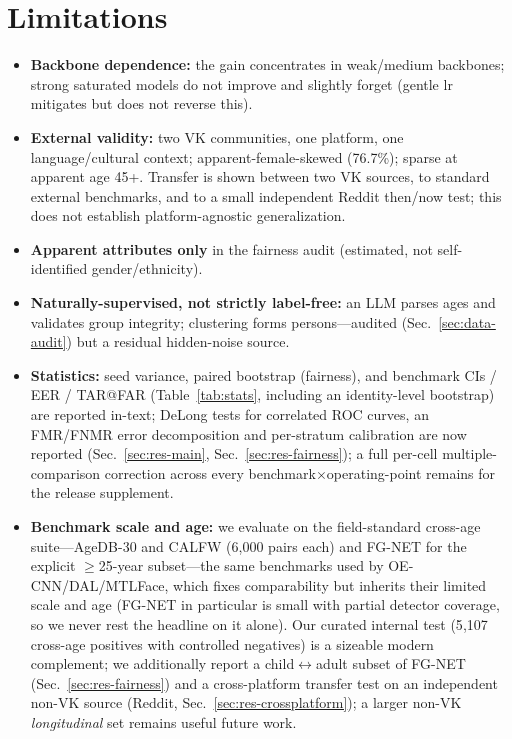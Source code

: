 \documentclass[journal]{IEEEtran}
\begin{document}
\section{Limitations}\label{sec:limitations}
\begin{itemize}[leftmargin=1.2em]
\item \textbf{Backbone dependence:} the gain concentrates in weak/medium backbones; strong saturated models do not improve and slightly forget (gentle lr mitigates but does not reverse this).
\item \textbf{External validity:} two VK communities, one platform, one language/cultural context; apparent-female-skewed (76.7\%); sparse at apparent age 45+. Transfer is shown between two VK sources, to standard external benchmarks, and to a small independent Reddit then/now test; this does not establish platform-agnostic generalization.
\item \textbf{Apparent attributes only} in the fairness audit (estimated, not self-identified gender/ethnicity).
\item \textbf{Naturally-supervised, not strictly label-free:} an LLM parses ages and validates group integrity; clustering forms persons---audited (Sec.~\ref{sec:data-audit}) but a residual hidden-noise source.
\item \textbf{Statistics:} seed variance, paired bootstrap (fairness), and benchmark CIs / EER / TAR@FAR (Table~\ref{tab:stats}, including an identity-level bootstrap) are reported in-text; DeLong tests for correlated ROC curves, an FMR/FNMR error decomposition and per-stratum calibration are now reported (Sec.~\ref{sec:res-main}, Sec.~\ref{sec:res-fairness}); a full per-cell multiple-comparison correction across every benchmark$\times$operating-point remains for the release supplement.
\item \textbf{Benchmark scale and age:} we evaluate on the field-standard cross-age suite---AgeDB-30 and CALFW (6{,}000 pairs each) and FG-NET for the explicit $\geq$25-year subset---the same benchmarks used by OE-CNN/DAL/MTLFace, which fixes comparability but inherits their limited scale and age (FG-NET in particular is small with partial detector coverage, so we never rest the headline on it alone). Our curated internal test (5{,}107 cross-age positives with controlled negatives) is a sizeable modern complement; we additionally report a child$\leftrightarrow$adult subset of FG-NET (Sec.~\ref{sec:res-fairness}) and a cross-platform transfer test on an independent non-VK source (Reddit, Sec.~\ref{sec:res-crossplatform}); a larger non-VK \emph{longitudinal} set remains useful future work.

\end{itemize}
\end{document}
